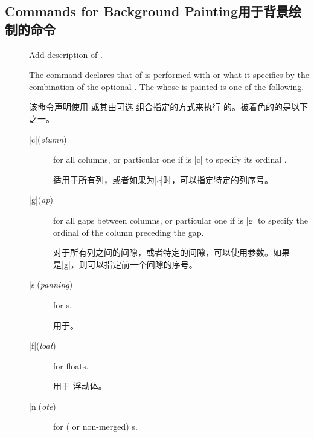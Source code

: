 
\subsection{Commands for Background Painting\hfill 用于背景绘制的命令}
\label{sec:ref-bgpaint}

\begin{description}
\item[\Midx{\!\backgroundcolor!}]
    \mbox{}\par
{}
    \mbox{}\par
{}
    \mbox{}\par
{}
{Add description of .}

The command declares that {\em\Uidx\bgpaint} of  is performed
with  or what it specifies by the combination of the optional
.  The  whose \bground{} is painted is one of the
following.

该命令声明使用  或其由可选  组合指定的方式来执行  的{\em\Uidx\bgpaint}。被着色的\bground{}的是以下之一。

\begin{description}
\item[|c|\rm(\textit{olumn})] for all columns, or particular one if
 is |c| to specify its ordinal .

适用于所有列，或者如果为|c|时，可以指定特定的列序号。
\item[|g|\rm(\textit{ap})] for all gaps between columns, or particular one
if  is |g| to specify the ordinal  of the
column preceding the gap.

对于所有列之间的间隙，或者特定的间隙，可以使用参数。如果是|g|，则可以指定前一个间隙的序号。

\item[|s|\rm(\textit{panning})] for \mctext{}s.

用于\mctext{}。
\item[|f|\rm(\textit{loat})] for \pwise{} floats.

用于 \pwise{} 浮动体。
\item[|n|\rm(\textit{ote})] for (\mgfnote{} or non-merged) \Scfnote{}s.


\end{description}
\end{description}
